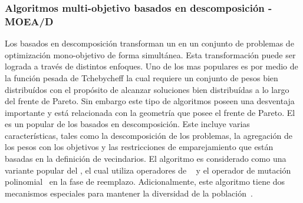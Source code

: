 \subsubsection{Algoritmos multi-objetivo basados en descomposición - MOEA/D}

Los \MOEAS{} basados en descomposición \cite{Joel:MOEAD} transforman un \MOP{} en un conjunto de problemas de optimización mono-objetivo de forma simultánea.
%
Esta transformación puede ser lograda a través de distintos enfoques.
%
Uno de los mas populares es por medio de la función pesada de Tchebycheff la cual requiere un conjunto de pesos bien distribuídos con el propósito de alcanzar soluciones bien distribuídas a lo largo del frente de Pareto.
%
Sin embargo este tipo de algoritmos poseen una desventaja importante y está relacionada con la geometría que posee el frente de Pareto.
El \MOEA{}~\cite{Joel:MOEAD} es un \MOEA{} popular de los basados en descomposición.
%
Este incluye varias características, tales como la descomposición de los problemas, la agregación de los pesos con los objetivos y las restricciones de emparejamiento que están basadas en la definición de vecindarios.
%
%
El algoritmo \MOEADDE{} es considerado como una variante popular del \MOEAD{}, el cual utiliza operadores de \DE{}~\cite{price2006differential} y el operador de mutación polinomial~\cite{hamdan2012distribution} en la fase de reemplazo.
%
Adicionalmente, este algoritmo tiene dos mecanismos especiales para mantener la diversidad de la población~\cite{zhang2009performance}.
%

